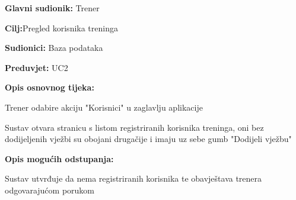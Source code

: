 				   				
				   		\begin{packed_item}
				   		
				   		\item \textbf{Glavni sudionik: }Trener
				   		\item  \textbf{Cilj:}Pregled korisnika treninga
				   		\item  \textbf{Sudionici:} Baza podataka
				   		\item  \textbf{Preduvjet:} UC2
				   		\item  \textbf{Opis osnovnog tijeka:}
				   		
				   		\item[] \begin{packed_enum}
				   			
				   			\item Trener odabire akciju "Korisnici" u zaglavlju aplikacije
				   			\item Sustav otvara stranicu s listom registriranih korisnika treninga, oni bez dodijeljenih vježbi su obojani drugačije i imaju uz sebe gumb "Dodijeli vježbu"
				   			
				   		\end{packed_enum}
				   		
				   		\item  \textbf{Opis mogućih odstupanja:}
				   		
				   		\begin{packed_enum}
				   			
				   			\item[2.a]Sustav utvrđuje da nema registriranih korisnika te obavještava trenera odgovarajućom porukom
				   			
				   		\end{packed_enum}
				   		
				   	\end{packed_item}
			   	
			   	\noindent {}	
			   		
